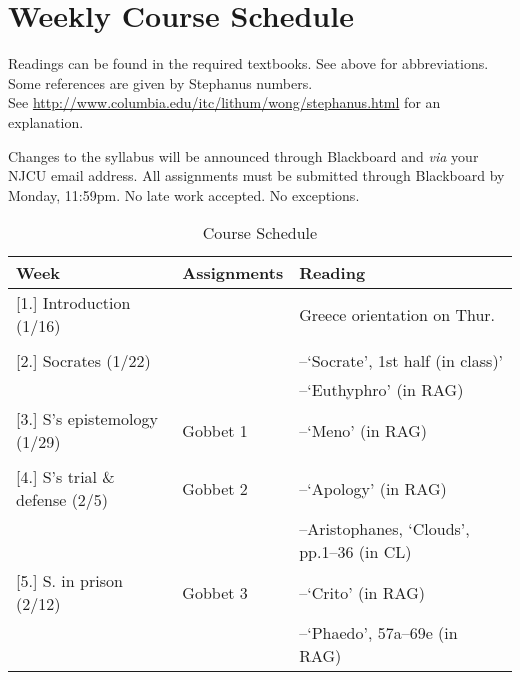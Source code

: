 \documentclass[article,oneside]{memoir}
\begin{document}
\section{Weekly Course Schedule}
Readings can be found in the required textbooks. See above for abbreviations. Some references are given by Stephanus numbers.\\ See \href{http://www.columbia.edu/itc/lithum/wong/stephanus.html}{http://www.columbia.edu/itc/lithum/wong/stephanus.html} for an explanation. 

 Changes to the syllabus will be announced through Blackboard and \emph{via} your NJCU email address.  All assignments must be submitted through Blackboard by Monday, 11:59pm. No late work accepted. No exceptions.   \newline

\begin{center}
\begin{longtable}{p{4.5cm}p{2cm}p{6cm}}
 
  \caption{Course Schedule} \\
  \toprule
  \textbf{Week} &\textbf{Assignments} & \textbf{Reading} \\
  \midrule

  

[1.] Introduction	(1/16)	  			& 	 			& Greece orientation on Thur.  \\ 
								&		  		&    \\ [1.8\baselineskip]

[2.] Socrates (1/22)					& 				& --`Socrate', 1st half (in class)' \\
			        					&			  	& --`Euthyphro'  (in RAG) \\  [1.8\baselineskip]
	
[3.] S's epistemology  (1/29)				& Gobbet 1		&  --`Meno' (in RAG) \\
			       					&		  		&   \\[1.8\baselineskip]


[4.] S's trial \& defense (2/5)				& Gobbet 2		& --`Apology' (in RAG) \\
			     				   	& 			    	& --Aristophanes, `Clouds', pp.1--36 (in CL) \\ [1.8\baselineskip]

[5.] S. in prison (2/12)	& Gobbet 3		 & --`Crito' (in RAG)\\
								& 			    	&  --`Phaedo', 57a--69e (in RAG)\\ [1.8\baselineskip]




\end{longtable}
\end{center}
\end{document}
